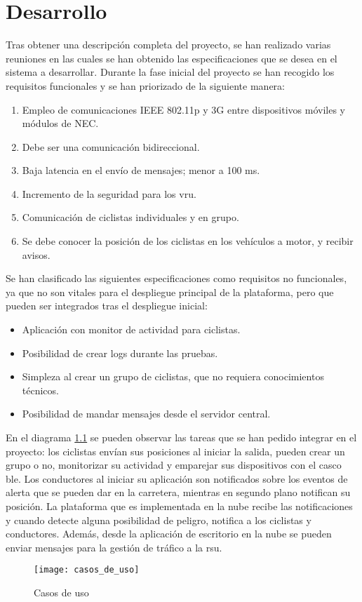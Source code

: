 \chapter{Desarrollo}\label{cha:desarrollo}
Tras obtener una descripción completa del proyecto, se han realizado varias reuniones en las cuales se han
obtenido las especificaciones que se desea en el sistema a desarrollar. Durante la fase inicial del proyecto
se han recogido los requisitos funcionales y se han priorizado de la siguiente manera:
\begin{enumerate}
	\item Empleo de comunicaciones IEEE 802.11p y 3G entre dispositivos móviles y módulos de NEC.
	\item Debe ser una comunicación bidireccional.
	\item Baja latencia en el envío de mensajes; menor a 100 ms.
	\item Incremento de la seguridad para los \gls{vru}.
	\item Comunicación de ciclistas individuales y en grupo.
	\item Se debe conocer la posición de los ciclistas en los vehículos a motor, y recibir avisos.
\end{enumerate}

Se han clasificado las siguientes especificaciones como requisitos no funcionales, ya que no son vitales
para el despliegue principal de la plataforma, pero que pueden ser integrados tras el despliegue inicial:
\begin{itemize}
	\item Aplicación con monitor de actividad para ciclistas.
	\item Posibilidad de crear logs durante las pruebas.
	\item Simpleza al crear un grupo de ciclistas, que no requiera conocimientos técnicos.
	\item Posibilidad de mandar mensajes desde el servidor central.
\end{itemize}

En el diagrama \ref{fig:casos_de_uso} se pueden observar las tareas que se han pedido integrar en el
proyecto: los ciclistas envían sus posiciones al iniciar la salida, pueden crear un grupo o no, monitorizar
su actividad y emparejar sus dispositivos con el casco \gls{ble}. Los conductores al iniciar su aplicación
son notificados sobre los eventos de alerta que se pueden dar en la carretera, mientras en segundo plano
notifican su posición. La plataforma que es implementada en la nube recibe las notificaciones y cuando
detecte alguna posibilidad de peligro, notifica a los ciclistas y conductores. Además, desde la aplicación
de escritorio en la nube se pueden enviar mensajes para la gestión de tráfico a la \gls{rsu}.
\begin{figure}[H]
	\begin{center}
		\texttt{[image: casos\_de\_uso]}
		\caption{Casos de uso}
		\label{fig:casos_de_uso}
	\end{center}
\end{figure}

